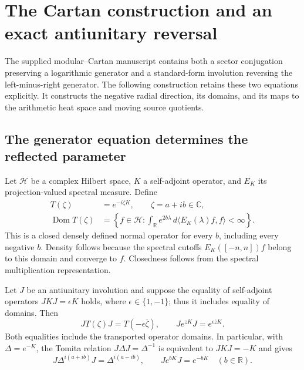 \section{The Cartan construction and an exact antiunitary reversal}
\label{sec:cq-cartan-heat}

The supplied modular--Cartan manuscript \cite{cqCartan} contains both
a sector conjugation preserving a logarithmic generator and a
standard-form involution reversing the left-minus-right generator.
The following construction retains these two equations explicitly.
It constructs the negative radial direction, its domains, and its
maps to the arithmetic heat space and moving source quotients.

\subsection{The generator equation determines the reflected parameter}

Let $\mathscr H$ be a complex Hilbert space, $K$ a self-adjoint
operator, and $E_K$ its projection-valued spectral measure. Define
\begin{equation}
\begin{split}
 T(\zeta)&=e^{-i\zeta K},\qquad \zeta=a+ib\in\mathbb C,\\
 \operatorname{Dom}T(\zeta)
 &=\left\{f\in\mathscr H:
       \int_{\mathbb R}e^{2b\lambda}\,
                   d\langle E_K(\lambda)f,f\rangle<\infty\right\}.
\end{split}
\label{eq:cq-cartan-complex-domain}
\end{equation}
This is a closed densely defined normal operator for every $b$,
including every negative $b$. Density follows because the spectral
cutoffs $E_K([-n,n])f$ belong to this domain and converge to $f$.
Closedness follows from the spectral multiplication representation.

\begin{cqproposition}
Let $J$ be an antiunitary involution and suppose the equality of
self-adjoint operators $JKJ=\epsilon K$ holds, where
$\epsilon\in\{1,-1\}$; thus it includes equality of domains.
Then
\begin{equation}
 JT(\zeta)J=T(-\epsilon\overline\zeta),\qquad
 J e^{zK}J=e^{\epsilon\overline zK}.
 \label{eq:cq-cartan-parity}
\end{equation}
Both equalities include the transported operator domains.
In particular, with $\Delta=e^{-K}$, the Tomita relation
$J\Delta J=\Delta^{-1}$ is equivalent to $JKJ=-K$ and gives
\begin{equation}
 J\Delta^{i(a+ib)}J=\Delta^{i(a-ib)},\qquad
 J e^{bK}J=e^{-bK}\quad(b\in\mathbb R).
 \label{eq:cq-Tomita-radial-reversal}
\end{equation}
\end{cqproposition}

